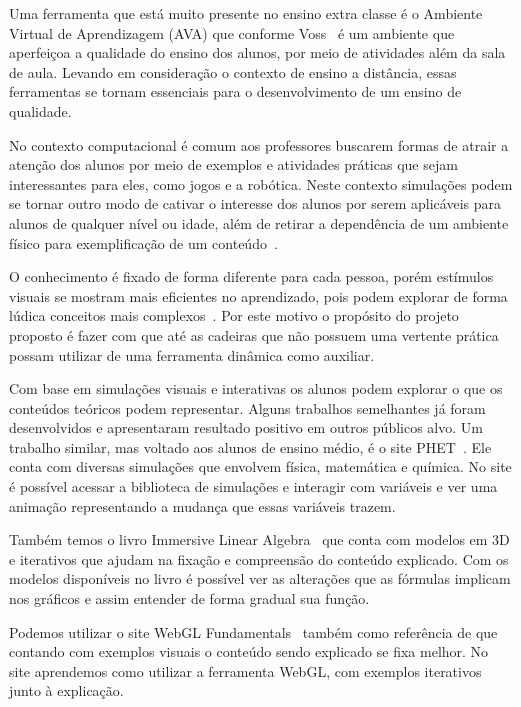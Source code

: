 \documentclass[tcc-proposta]{texufpel}
\begin{document}
Uma ferramenta que está muito presente no ensino extra classe é o Ambiente Virtual de Aprendizagem (AVA) que conforme Voss~\cite{Voss_Nunes_Herpich_Medina_2015} é um ambiente que aperfeiçoa a qualidade do ensino dos alunos, por meio de atividades além da sala de aula. Levando em consideração o contexto de ensino a distância, essas ferramentas se tornam essenciais para o desenvolvimento de um ensino de qualidade. 

No contexto computacional é comum aos professores buscarem formas de atrair a atenção dos alunos por meio de exemplos e atividades práticas que sejam interessantes para eles, como jogos e a robótica. Neste contexto simulações podem se tornar outro modo de cativar o interesse dos alunos por serem aplicáveis para alunos de qualquer nível ou idade, além de retirar a dependência de um ambiente físico para exemplificação de um conteúdo~\cite{kincaid2003simulation}.

O conhecimento é fixado de forma diferente para cada pessoa, porém estímulos visuais se mostram mais eficientes no aprendizado, pois podem explorar de forma lúdica conceitos mais complexos~\cite{klawe1999computer}. Por este motivo o propósito do projeto proposto é fazer com que até as cadeiras que não possuem uma vertente prática possam utilizar de uma ferramenta dinâmica como auxiliar.

Com base em simulações visuais e interativas os alunos podem explorar o que os conteúdos teóricos podem representar. Alguns trabalhos semelhantes já foram desenvolvidos e apresentaram resultado positivo em outros públicos alvo. Um trabalho similar, mas voltado aos alunos de ensino médio, é o site PHET~\cite{phet_2002}. Ele conta com diversas simulações que envolvem física, matemática e química. No site é possível acessar a biblioteca de simulações e interagir com variáveis e ver uma animação representando a mudança que essas variáveis trazem. 

Também temos o livro Immersive Linear Algebra~\cite{strom2017immersive} que conta com modelos em 3D e iterativos que ajudam na fixação e compreensão do conteúdo explicado. Com os modelos disponíveis no livro é possível ver as alterações que as fórmulas implicam nos gráficos e assim entender de forma gradual sua função.

Podemos utilizar o site WebGL Fundamentals~\cite{webgl_2017} também como referência de que contando com exemplos visuais o conteúdo sendo explicado se fixa melhor. No site aprendemos como utilizar a ferramenta WebGL, com exemplos iterativos junto à explicação.
\end{document}
